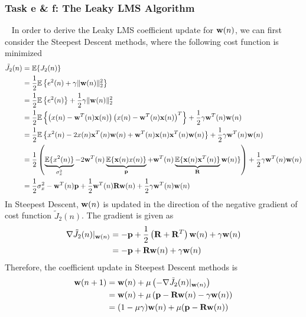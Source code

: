 \documentclass[10pt]{article}
\begin{document}
\subsubsection{Task e \& f: The Leaky LMS Algorithm}
\ \indent
In order to derive the Leaky LMS coefficient update for ${\bf{w}}(n)$, we can 
first consider the Steepest Descent methods, where the following cost function is minimized
\begin{align}
	\tilde{J}_2(n) & = \mathbb{E} \{ J_2(n) \} \nonumber \\
	& = \frac{1}{2} \mathbb{E} \left\{ e^2(n) + \gamma \Vert {\bf{w}}(n) \Vert_2^2 \right\} \nonumber \\
	& = \frac{1}{2} \mathbb{E} \left\{ e^2(n) \right\} + \frac{1}{2} \gamma \Vert {\bf{w}}(n) \Vert_2^2 \nonumber \\
	& = \frac{1}{2} \mathbb{E} \left\{ \left( x(n) - {\bf{w}}^T(n) {\bf{x}}(n) \right) \left( x(n) - {\bf{w}}^T(n) {\bf{x}}(n) \right)^T  \right\} + \frac{1}{2} \gamma {\bf{w}}^T(n) {\bf{w}}(n) \nonumber \\
	& = \frac{1}{2} \mathbb{E} \left\{ x^2(n) - 2 x(n) {\bf{x}}^T(n) {\bf{w}}(n) + {\bf{w}}^T(n) {\bf{x}}(n) {\bf{x}}^T(n) {\bf{w}}(n) \right\} + \frac{1}{2} \gamma {\bf{w}}^T(n) {\bf{w}}(n) \nonumber \\
	& = \frac{1}{2} \left( \underbrace{\mathbb{E} \{x^2(n) \}}_{\sigma_x^2} - 2 {\bf{w}}^T(n) \underbrace{\mathbb{E} \{ {\bf{x}}(n)x(n) \}}_{\bf{p}} + {\bf{w}}^T(n) \underbrace{\mathbb{E} \{ {\bf{x}}(n) {\bf{x}}^T(n) \}}_{\bf{R}} {\bf{w}}(n) \} \right) + \frac{1}{2} \gamma {\bf{w}}^T(n) {\bf{w}}(n) \nonumber \\
	& = \frac{1}{2} \sigma_x^2 - {\bf{w}}^T(n) {\bf{p}} + \frac{1}{2} {\bf{w}}^T(n) {\bf{R}} {\bf{w}}(n) + \frac{1}{2} \gamma {\bf{w}}^T(n) {\bf{w}}(n)
\end{align}
In Steepest Descent, ${\bf{w}}(n)$ is updated in the direction of the negative gradient of cost function $\tilde{J}_2(n)$. The gradient is given as 
\begin{align}
	\nabla \tilde{J}_2(n) |_{{\bf{w}}(n)} & = -{\bf{p}} + \frac{1}{2} \left( {\bf{R}} + {\bf{R}}^T \right) {\bf{w}}(n) + \gamma {\bf{w}}(n) \nonumber \\
	& = -{\bf{p}} + {\bf{R}} {\bf{w}}(n) + \gamma {\bf{w}}(n)
\end{align}
Therefore, the coefficient update in Steepest Descent methods is 
\begin{align}
	{\bf{w}}(n+1) & = {\bf{w}}(n) + \mu \left( -\nabla \tilde{J}_2(n) |_{{\bf{w}}(n)} \right) \nonumber \\
	& = {\bf{w}}(n) + \mu \left( {\bf{p}} - {\bf{R}} {\bf{w}}(n) - \gamma {\bf{w}}(n) \right) \nonumber \\
	& = (1 - \mu \gamma) {\bf{w}}(n) + \mu ({\bf{p}} - {\bf{R}} {\bf{w}}(n)) \label{eq34}
\end{align}
\end{document}

